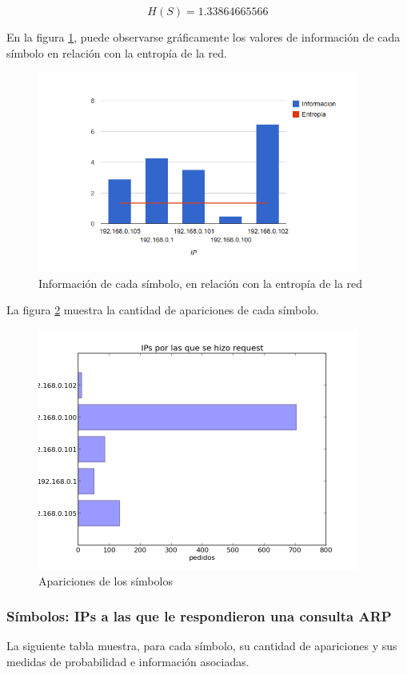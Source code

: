 \documentclass{article}
\begin{document}
$$H(S) = 1.33864665566$$

En la figura \ref{fig:red2requested:infoentro}, puede observarse gráficamente
los valores de información de cada símbolo en relación con la entropía de la
red.

\begin{figure}[h!]
    \centering                                                       
    \includegraphics[width=300pt]{red2/consultadas2.png}
    \caption{Información de cada símbolo, en relación con la
        entropía de la red}
    \label{fig:red2requested:infoentro}
\end{figure}

La figura \ref{fig:red2requested:count} muestra la cantidad de apariciones de
cada símbolo.

\begin{figure}[h!]
    \centering
    \includegraphics[width=300pt]{red2/red2requested.png}
    \caption{Apariciones de los símbolos}
    \label{fig:red2requested:count}
\end{figure}

\newpage

\subsubsection{Símbolos: IPs a las que le respondieron una consulta ARP}
La siguiente tabla muestra, para cada símbolo, su cantidad de apariciones y
sus medidas de probabilidad e información asociadas.
\end{document}
